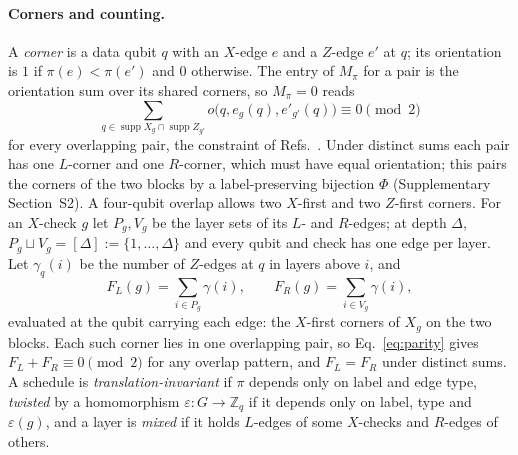 \documentclass[reprint,twocolumn,superscriptaddress,nofootinbib]{revtex4-2}
\theoremstyle{plain}
\newcommand{\Zq}{\mathbb{Z}_q}
\begin{document}
\paragraph*{Corners and counting.}
A \emph{corner} is a data qubit $q$ with an $X$-edge $e$ and a $Z$-edge $e'$
at $q$; its orientation is $1$ if $\pi(e)<\pi(e')$ and $0$ otherwise. The
entry of $M_\pi$ for a pair is the orientation sum over its shared corners,
so $M_\pi=0$ reads
\begin{equation}
\sum_{q\in\operatorname{supp}X_g\cap\operatorname{supp}Z_{g'}}
o\bigl(q,e_g(q),e'_{g'}(q)\bigr)\equiv0\pmod 2
\label{eq:parity}
\end{equation}
for every overlapping pair, the constraint of
Refs.~\cite{Conrad2018,Zhang2026ASC,Nguyen2026}. Under distinct sums each
pair has one $L$-corner and one $R$-corner, which must have equal
orientation; this pairs the corners of the two blocks by a
label-preserving bijection $\Phi$ (Supplementary Section~S2). A four-qubit
overlap allows two $X$-first and two $Z$-first corners. For an $X$-check
$g$ let $P_g,V_g$ be the layer sets of its $L$- and $R$-edges; at depth
$\Delta$, $P_g\sqcup V_g=[\Delta]:=\{1,\dots,\Delta\}$ and every qubit and
check has one edge per layer. Let $\gamma_q(i)$ be the number of $Z$-edges
at $q$ in layers above $i$, and
\begin{equation}
F_L(g)=\sum_{i\in P_g}\gamma(i),\qquad F_R(g)=\sum_{i\in V_g}\gamma(i),
\label{eq:FLFR}
\end{equation}
evaluated at the qubit carrying each edge: the $X$-first corners of $X_g$ on
the two blocks. Each such corner lies in one overlapping pair, so
Eq.~\eqref{eq:parity} gives $F_L+F_R\equiv0\pmod 2$ for any overlap
pattern, and $F_L=F_R$ under distinct sums. A schedule is
\emph{translation-invariant} if $\pi$ depends only on label and edge type,
\emph{twisted} by a homomorphism $\varepsilon:G\to\Zq$ if it depends only
on label, type and $\varepsilon(g)$, and a layer is \emph{mixed} if it
holds $L$-edges of some $X$-checks and $R$-edges of others.
\end{document}

